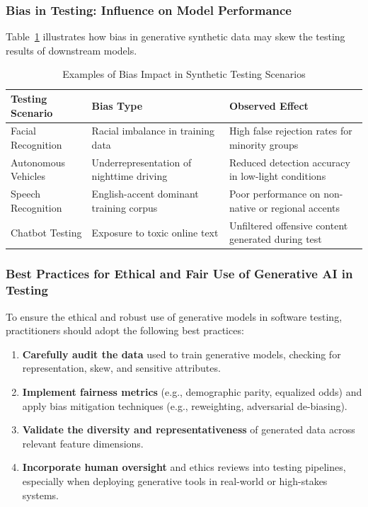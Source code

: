 \documentclass[manuscript,screen,review]{acmart}
\begin{document}
\subsubsection{Bias in Testing: Influence on Model Performance}

Table~\ref{tab:bias-impact} illustrates how bias in generative synthetic data may skew the testing results of downstream models.

\begin{table}[htbp]
\centering
\caption{Examples of Bias Impact in Synthetic Testing Scenarios}
\label{tab:bias-impact}
\begin{tabular}{|p{4.2cm}|p{4cm}|p{4.5cm}|}
\hline
\textbf{Testing Scenario} & \textbf{Bias Type} & \textbf{Observed Effect} \\
\hline
Facial Recognition & Racial imbalance in training data & High false rejection rates for minority groups \\
\hline
Autonomous Vehicles & Underrepresentation of nighttime driving & Reduced detection accuracy in low-light conditions \\
\hline
Speech Recognition & English-accent dominant training corpus & Poor performance on non-native or regional accents \\
\hline
Chatbot Testing & Exposure to toxic online text & Unfiltered offensive content generated during test \\
\hline
\end{tabular}
\end{table}

\subsubsection{Best Practices for Ethical and Fair Use of Generative AI in Testing}

To ensure the ethical and robust use of generative models in software testing, practitioners should adopt the following best practices:

\begin{enumerate}
  \item \textbf{Carefully audit the data} used to train generative models, checking for representation, skew, and sensitive attributes.
  \item \textbf{Implement fairness metrics} (e.g., demographic parity, equalized odds) and apply bias mitigation techniques (e.g., reweighting, adversarial de-biasing).
  \item \textbf{Validate the diversity and representativeness} of generated data across relevant feature dimensions.
  \item \textbf{Incorporate human oversight} and ethics reviews into testing pipelines, especially when deploying generative tools in real-world or high-stakes systems.
\end{enumerate}
\end{document}
